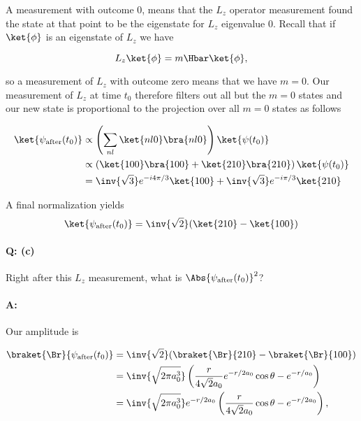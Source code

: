 {A measurement with outcome 0, means that the \(L_z\) operator measurement found the state at that point to be the eigenstate for \(L_z\) eigenvalue 0.  Recall that  if \(\ket{\phi}\) is an eigenstate of \(L_z\) we have

\begin{equation}\label{eqn:qmIexamPractice2007Dec:4:200}
L_z \ket{\phi} = m \Hbar \ket{\phi},
\end{equation}

so a measurement of \(L_z\) with outcome zero means that we have \(m=0\).  Our measurement of \(L_z\) at time \(t_0\) therefore filters out all but the \(m=0\) states and our new state is proportional to the projection over all \(m=0\) states as follows

\begin{equation}\label{eqn:qmIexamPractice2007Dec:510}
\begin{aligned}
\ket{\psi_{\text{after}}(t_0)}
&\propto \left( \sum_{n l} \ket{n l 0}\bra{n l 0} \right) \ket{\psi(t_0)}  \\
&\propto \left(
\ket{1 0 0}\bra{1 0 0}
+\ket{2 1 0}\bra{2 1 0}
\right) \ket{\psi(t_0)}  \\
&=
\inv{\sqrt{3}} e^{-i 4 \pi / 3} \ket{100}
+\inv{\sqrt{3}} e^{- i \pi / 3 } \ket{210}
\end{aligned}
\end{equation}

A final normalization yields
\begin{equation}\label{eqn:qmIexamPractice2007Dec:4:210}
\ket{\psi_{\text{after}}(t_0)}
= \inv{\sqrt{2}} (\ket{210} - \ket{100})
\end{equation}

\paragraph{Q: (c)}

Right after this \(L_z\) measurement, what is \(\Abs{\psi_{\text{after}}(t_0)}^2\)?

\paragraph{A:}

Our amplitude is

\begin{equation}\label{eqn:qmIexamPractice2007Dec:530}
\begin{aligned}
\braket{\Br}{\psi_{\text{after}}(t_0)}
&= \inv{\sqrt{2}} (\braket{\Br}{210} - \braket{\Br}{100}) \\
&= \inv{\sqrt{2 \pi a_0^3}}
\left(
\frac{r}{4\sqrt{2} a_0} e^{-r/2a_0} \cos\theta
-e^{-r/a_0}
\right) \\
&= \inv{\sqrt{2 \pi a_0^3}}
e^{-r/2 a_0}
\left(
\frac{r}{4\sqrt{2} a_0} \cos\theta
-e^{-r/2 a_0}
\right),
\end{aligned}
\end{equation}

}
